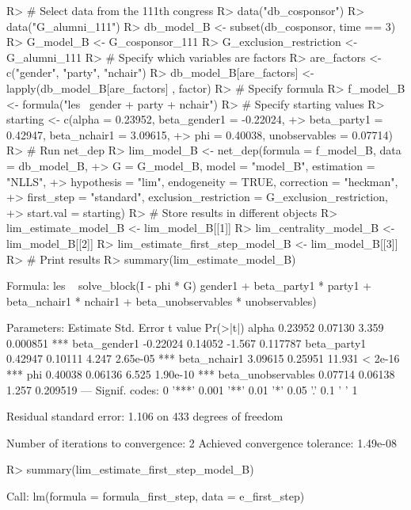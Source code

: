 \documentclass[nojss]{jss}
\begin{document}
\begin{CodeChunk}
\begin{CodeInput}
R> # Select data from the 111th congress
R> data("db_cosponsor")
R> data("G_alumni_111")
R> db_model_B <- subset(db_cosponsor, time == 3)
R> G_model_B <- G_cosponsor_111
R> G_exclusion_restriction <- G_alumni_111
R> # Specify which variables are factors
R> are_factors <- c("gender", "party", "nchair")
R> db_model_B[are_factors] <- lapply(db_model_B[are_factors] , factor)
R> # Specify formula
R> f_model_B <- formula("les ~gender + party + nchair")
R> # Specify starting values
R> starting <- c(alpha = 0.23952, beta_gender1 = -0.22024,
+> beta_party1 = 0.42947, beta_nchair1 = 3.09615,
+> phi = 0.40038, unobservables = 0.07714)
R> # Run net_dep
R> lim_model_B <- net_dep(formula = f_model_B, data = db_model_B,
+> G = G_model_B, model = "model_B", estimation = "NLLS",
+> hypothesis = "lim", endogeneity = TRUE, correction = "heckman",
+> first_step = "standard", exclusion_restriction = G_exclusion_restriction, 
+> start.val = starting)
R> # Store results in different objects
R> lim_estimate_model_B <- lim_model_B[[1]]
R> lim_centrality_model_B <- lim_model_B[[2]]
R> lim_estimate_first_step_model_B <- lim_model_B[[3]]
R> # Print results
R> summary(lim_estimate_model_B)
\end{CodeInput}
\begin{CodeOutput}
Formula: les ~ solve_block(I - phi * G) %
gender1 + beta_party1 * party1 + beta_nchair1 * nchair1 + 
beta_unobservables * unobservables)

Parameters:
Estimate Std. Error t value Pr(>|t|)    
alpha               0.23952    0.07130   3.359 0.000851 ***
beta_gender1       -0.22024    0.14052  -1.567 0.117787    
beta_party1         0.42947    0.10111   4.247 2.65e-05 ***
beta_nchair1        3.09615    0.25951  11.931  < 2e-16 ***
phi                 0.40038    0.06136   6.525 1.90e-10 ***
beta_unobservables  0.07714    0.06138   1.257 0.209519    
---
Signif. codes:  0 '***' 0.001 '**' 0.01 '*' 0.05 '.' 0.1 ' ' 1

Residual standard error: 1.106 on 433 degrees of freedom

Number of iterations to convergence: 2 
Achieved convergence tolerance: 1.49e-08
\end{CodeOutput}
\begin{CodeInput}
R> summary(lim_estimate_first_step_model_B)
\end{CodeInput}
\begin{CodeOutput}
Call:
lm(formula = formula_first_step, data = e_first_step)


\end{CodeOutput}
\end{CodeChunk}
\end{document}
